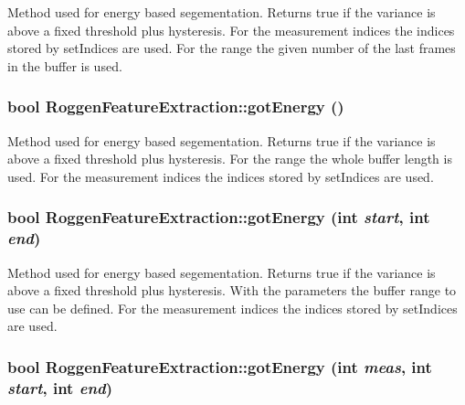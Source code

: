 \label{classRoggenFeatureExtraction_ae1028692308f074789b65831af17fc7c}
Method used for energy based segementation. Returns true if the variance is above a fixed threshold plus hysteresis. For the measurement indices the indices stored by setIndices are used. For the range the given number of the last frames in the buffer is used. \hypertarget{classRoggenFeatureExtraction_a4fda7caa695bf01ac5693990bb0a3182}{
\subsubsection[{gotEnergy}]{\setlength{\rightskip}{0pt plus 5cm}bool RoggenFeatureExtraction::gotEnergy ()}}
\label{classRoggenFeatureExtraction_a4fda7caa695bf01ac5693990bb0a3182}
Method used for energy based segementation. Returns true if the variance is above a fixed threshold plus hysteresis. For the range the whole buffer length is used. For the measurement indices the indices stored by setIndices are used. \hypertarget{classRoggenFeatureExtraction_ab5fa2410c5f12bcfbe4135c0995cb411}{
\subsubsection[{gotEnergy}]{\setlength{\rightskip}{0pt plus 5cm}bool RoggenFeatureExtraction::gotEnergy (int {\em start}, \/  int {\em end})}}
\label{classRoggenFeatureExtraction_ab5fa2410c5f12bcfbe4135c0995cb411}
Method used for energy based segementation. Returns true if the variance is above a fixed threshold plus hysteresis. With the parameters the buffer range to use can be defined. For the measurement indices the indices stored by setIndices are used. \hypertarget{classRoggenFeatureExtraction_a1f981cb1f8e481480a0feab550121b8e}{
\subsubsection[{gotEnergy}]{\setlength{\rightskip}{0pt plus 5cm}bool RoggenFeatureExtraction::gotEnergy (int {\em meas}, \/  int {\em start}, \/  int {\em end})}}
\label{classRoggenFeatureExtraction_a1f981cb1f8e481480a0feab550121b8e}
